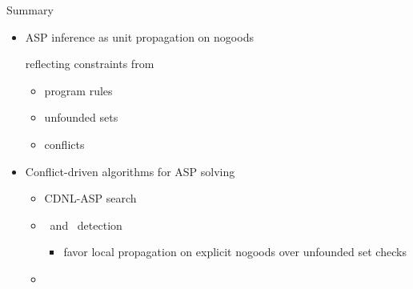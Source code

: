 \begin{frame}{Summary}
  \bigskip
  \begin{itemize}
  \item ASP inference as unit propagation on nogoods

    reflecting constraints from
    \begin{itemize}\normalsize
    \item program rules
    \item unfounded sets
    \item conflicts
    \end{itemize}
    \medskip
  \item Conflict-driven algorithms for ASP solving
    \begin{itemize}\normalsize
    \item {CDNL-ASP} search
      \smallskip
    \item \Propagation\ and \UnFoundedSet\ detection
      \begin{itemize}
      \item<only@2> [\itarrow] favor local propagation on explicit nogoods
        over unfounded set checks
      \end{itemize}
    \item \ConflictAnalysis
    \end{itemize}
  \end{itemize}
\end{frame}
%
